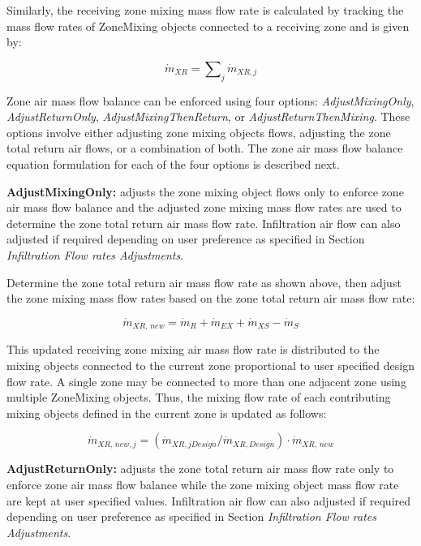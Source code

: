 Similarly, the receiving zone mixing mass flow rate is calculated by tracking the mass flow rates of ZoneMixing objects connected to a receiving zone and is given by:

\begin{equation}
{\dot m_{XR}} = \sum\nolimits_j {{{\dot m}_{XR,j}}}
\end{equation}

Zone air mass flow balance can be enforced using four options: \textit{AdjustMixingOnly}, \textit{AdjustReturnOnly}, \textit{AdjustMixingThenReturn}, or \textit{AdjustReturnThenMixing}.  These options involve either adjusting zone mixing objects flows, adjusting the zone total return air flows, or a
combination of both. The zone air mass flow balance equation formulation for each of the four options is described next.

\textbf{AdjustMixingOnly:} adjusts the zone mixing object flows only to enforce zone air mass flow balance and the adjusted zone mixing mass flow rates are used to determine the zone total return air mass flow rate. Infiltration air flow can also adjusted if required depending on user preference as specified in Section \textit{Infiltration Flow rates Adjustments}.

Determine the zone total return air mass flow rate as shown above, then adjust the zone mixing mass flow rates based on the zone total return air mass flow rate:

\begin{equation}
{\dot m_{XR,\,new}} = {\dot m_R} + {\dot m_{EX}} + {\dot m_{XS}} - {\dot m_S}
\end{equation}

This updated receiving zone mixing air mass flow rate is distributed to the mixing objects connected to the current zone proportional to user specified design flow rate. A single zone may be connected to more than one adjacent zone using multiple ZoneMixing objects. Thus, the mixing flow rate of each contributing mixing objects defined in the current zone is updated as follows:

\begin{equation}
{\dot m_{XR,\,new,j}} = \left( {{{\dot m}_{XR,jDesign}}/{{\dot m}_{XR,Design}}} \right) \cdot {\dot m_{XR,\,new}}
\end{equation}

\textbf{AdjustReturnOnly:} adjusts the zone total return air mass flow rate only to enforce zone air mass flow balance while the zone mixing object mass flow rate are kept at user specified values. Infiltration air flow can also adjusted if required depending on user preference as specified in Section \textit{Infiltration Flow rates Adjustments}.

